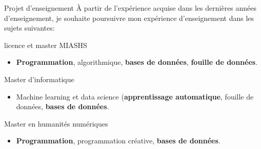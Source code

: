 \begin{frame}{Projet d'enseignement}
À partir de l'expérience acquise dans les dernières années d'enseignement, je souhaite poursuivre mon expérience d’enseignement dans les sujets suivantes:
\begin{block}{licence et master MIASHS}
\begin{itemize}
\item \textbf{Programmation}, algorithmique, \textbf{bases de données}, \textbf{fouille de données}.
\end{itemize}
\end{block}
	
\begin{block}{Master d’informatique}
\begin{itemize}
\item Machine learning et data science (\textbf{apprentissage automatique}, fouille de données, \textbf{bases de données}.
\end{itemize}
\end{block}

\begin{block}{Master en humanités numériques}
\begin{itemize}
\item \textbf{Programmation}, programmation créative, \textbf{bases de données}.
\end{itemize}
\end{block}

\end{frame}

